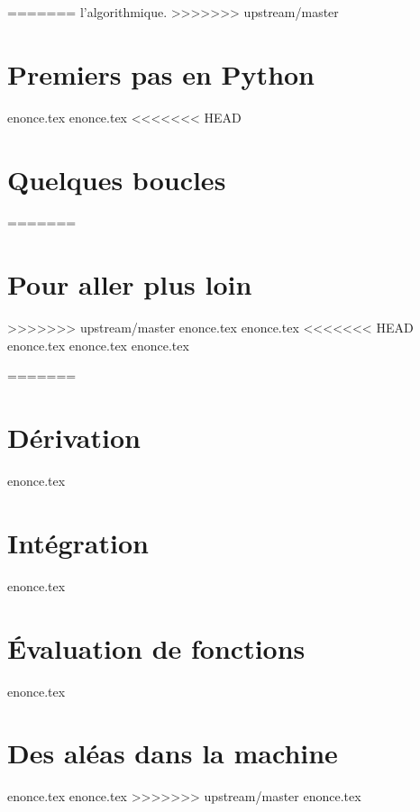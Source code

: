 \documentclass[a4paper,11pt,titlepage]{article}
\begin{document}
=======
l'algorithmique.
>>>>>>> upstream/master


\pagebreak
\section{Premiers pas en Python}
{enonce.tex}
\pagebreak
{enonce.tex}
<<<<<<< HEAD
\newpage
\section{Quelques boucles}
=======
\pagebreak
\section{Pour aller plus loin}
>>>>>>> upstream/master
{enonce.tex}
\pagebreak
{enonce.tex}
<<<<<<< HEAD
\newpage
{enonce.tex}
\newpage
{enonce.tex}
\newpage
{enonce.tex}
\newpage


=======
\pagebreak
\section{Dérivation}
{enonce.tex}
\pagebreak
\section{Intégration}
{enonce.tex}
\pagebreak
\section{Évaluation de fonctions}
{enonce.tex}
\pagebreak
\section{Des aléas dans la machine}
{enonce.tex}
\pagebreak
{enonce.tex}
\pagebreak
>>>>>>> upstream/master
{enonce.tex}
\end{document}
